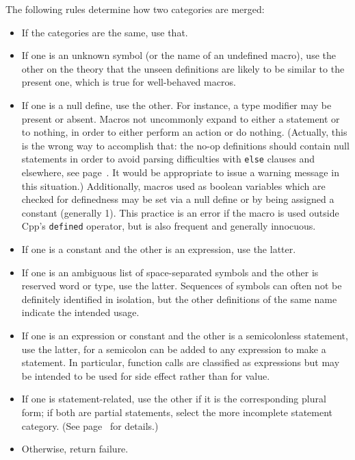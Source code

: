 \documentclass[10pt]{article}
\begin{document}
The following rules determine how two categories are merged:
\begin{itemize}\itemsep 0pt \parskip 0pt

\item If the categories are the same, use that.

\item If one is an unknown symbol (or the name of an undefined macro), use
  the other on the theory that the unseen definitions are likely to be
  similar to the present one, which is true for well-behaved macros.

\item If one is a null define, use the other.  For instance, a type
  modifier may be present or absent.  Macros not uncommonly expand to
  either a statement or to nothing, in order to either perform an action or
  do nothing.  (Actually, this is the wrong way to accomplish that: the
  no-op definitions should contain null statements in order to avoid
  parsing difficulties with {\tt else} clauses and elsewhere, see
  page~\pageref{item:swallow-semicolon}.  It would be appropriate to issue
  a warning message in this situation.)  Additionally, macros used as
  boolean variables which are checked for definedness may be set via a null
  define or by being assigned a constant (generally 1).  This practice is
  an error if the macro is used outside Cpp's {\tt defined} operator, but
  is also frequent and generally innocuous.

\item If one is a constant and the other is an expression, use the latter.

\item If one is an ambiguous list of space-separated symbols and the other
  is reserved word or type, use the latter.  Sequences of symbols can often
  not be definitely identified in isolation, but the other definitions of
  the same name indicate the intended usage.

\item If one is an expression or constant and the other is a semicolonless
  statement, use the latter, for a semicolon can be added to any expression
  to make a statement.  In particular, function calls are classified as
  expressions but may be intended to be used for side effect rather than
  for value.

\item If one is statement-related, use the other if it is the corresponding
  plural form; if both are partial statements, select the more incomplete
  statement category.  (See page~\pageref{item:statement-category} for
  details.)

\item Otherwise, return failure.
\end{itemize}
\end{document}
